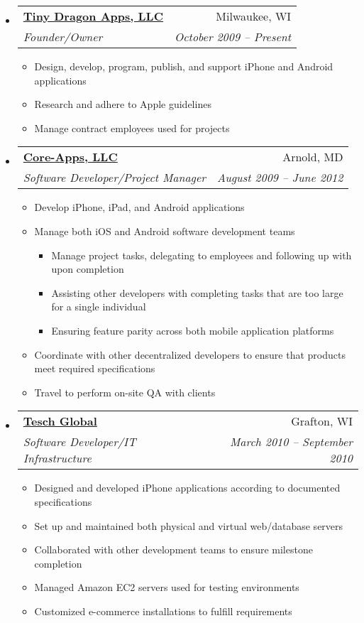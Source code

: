 \documentclass[letterpaper,12pt]{article}
\makeatletter
\newcommand{\resitem}[1]{\item #1 \vspace{-2pt}}
\newcommand{\ressubheading}[4]{
\begin{tabular*}{6.5in}{l@{\extracolsep{\fill}}r}
		\textbf{#1} & #2 \\
		\textit{#3} & \textit{#4} \\
\end{tabular*}\vspace{-6pt}}
\makeatother
\begin{document}
\begin{itemize}
      \item 
			\ressubheading{\href{http://itunes.apple.com/WebObjects/MZStore.woa/wa/viewArtist?id=337595590}{Tiny Dragon Apps, LLC}}{Milwaukee, WI}{Founder/Owner}{October 2009 -- Present}
				{ \footnotesize
				\begin{itemize}
					\resitem {Design, develop, program, publish, and support iPhone and Android applications}
					\resitem{Research and adhere to Apple guidelines}
					\resitem{Manage contract employees used for projects}
				\end{itemize}
         }
     \item 
			\ressubheading{\href{http://www.core-apps.com/Home.html}{Core-Apps, LLC}}{Arnold, MD}{Software Developer/Project Manager}{August 2009 -- June 2012}
				{ \footnotesize
				\begin{itemize}
					\resitem{Develop iPhone, iPad, and Android applications}
					\resitem{Manage both iOS and Android software development teams}
						\begin{itemize}
							\resitem{Manage project tasks, delegating to employees and following  up with upon completion}
							\resitem{Assisting other developers with completing tasks that are too large for a single individual}
							\resitem{Ensuring feature parity across both mobile application platforms}
						\end{itemize}
					\resitem{Coordinate with other decentralized developers to ensure that products meet required specifications}
					\resitem{Travel to perform on-site QA with clients}
				\end{itemize}
         }
     \item 
			\ressubheading{\href{http://www.teschglobal.com/}{Tesch Global}}{Grafton, WI}{Software Developer/IT Infrastructure}{March 2010 -- September 2010}
				{ \footnotesize
				\begin{itemize}
					\resitem{Designed and developed iPhone applications according to documented specifications}
					\resitem{Set up and maintained both physical and virtual web/database servers}
					\resitem{Collaborated with other development teams to ensure milestone completion}
					\resitem{Managed Amazon EC2 servers used for testing environments}
					\resitem{Customized e-commerce installations to fulfill requirements}
				\end{itemize}
         }


\end{itemize}
\end{document}
